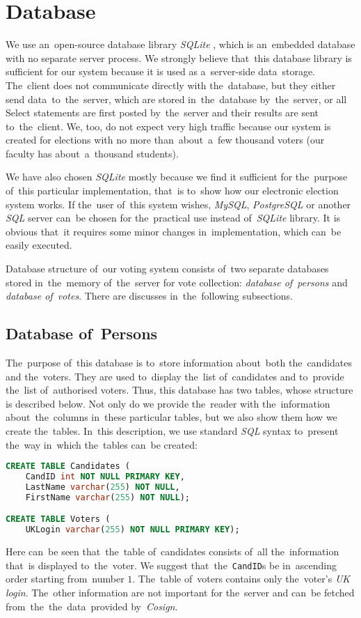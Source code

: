 \section{Database}
We use an~open-source database library \emph{SQLite} \cite{SQLite}, which is an~embedded database with no separate server process. We strongly believe that~this database library is sufficient for our system because it is used as a~server-side data~storage. The~client does not communicate directly with the~database, but they either send data~to~the~server, which are stored in~the~database by~the~server, or all Select statements are first posted by~the~server and their results are sent to~the~client. We, too, do not expect very high traffic because our system is created for elections with no more than~about~a~few thousand voters (our faculty has about~a~thousand students). 

We have also chosen \emph{SQLite} mostly because we find it sufficient for the~purpose of~this particular implementation, that~is to~show how our electronic election system works. If the~user of~this system wishes, \emph{MySQL}, \emph{PostgreSQL} or another \emph{SQL} server can~be chosen for the~practical use instead of~\emph{SQLite} library. It is obvious that~it requires some minor changes in~implementation, which can~be easily executed. 

Database structure of~our voting system consists of~two separate databases stored in~the~memory of~the~server for vote collection: \emph{database of~persons} and \emph{database of~votes}. There are discusses in~the~following subsections.

\subsection{Database of~Persons}
\label{sub:persons}
The~purpose of~this database is to~store information about~both the~candidates and the~voters. They are used to~display the~list of~candidates and to~provide the~list of~authorised voters. Thus, this database has two tables, whose structure is described below. Not only do we provide the~reader with the~information about~the~columns in~these particular tables, but we also show them how we create the~tables. In~this description, we use standard \emph{SQL} syntax to~present the~way in~which the~tables can~be created:  
\break
\begin{lstlisting}[language=SQL]
CREATE TABLE Candidates (
	CandID int NOT NULL PRIMARY KEY,
	LastName varchar(255) NOT NULL, 
	FirstName varchar(255) NOT NULL);	

CREATE TABLE Voters (
	UKLogin varchar(255) NOT NULL PRIMARY KEY);
\end{lstlisting}
\bigbreak
Here can~be seen that~the~table of~candidates consists of~all the~information that~is displayed to~the~voter. We suggest that~the~\texttt{CandID}s be in~ascending order starting from~number $1$. The~table of~voters contains only the~voter's \emph{UK login}. The~other information are not important for the~server and can~be fetched from~the~the~data~provided by~\emph{Cosign}. 

